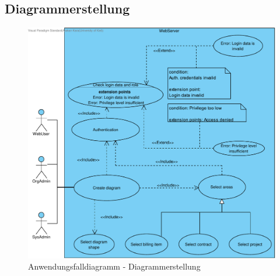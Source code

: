 \clearpage

\subsection{Diagrammerstellung}

\begin{figure}[h]
    \centering
    \includegraphics[width=\linewidth]{img/diagrams/Create_Custom_Diagram.pdf}
    \caption{Anwendungsfalldiagramm - Diagrammerstellung}
    \label{fig:anwendungsfalldiagramm-dia-erstellung}
\end{figure}

